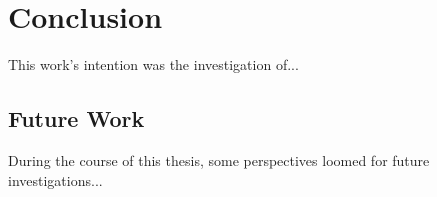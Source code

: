 \chapter{Conclusion} 
\label{cha:conclusion}

This work's intention was the investigation of...

\section{Future Work}

During the course of this thesis, some perspectives loomed for future investigations...
